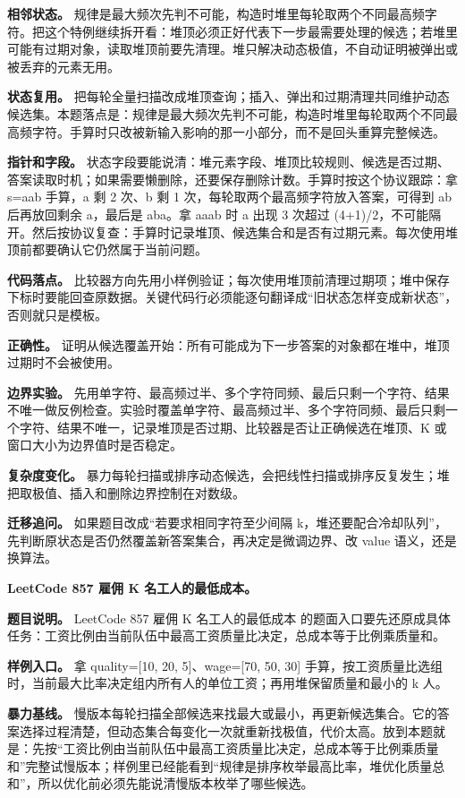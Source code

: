 \textbf{相邻状态。} 规律是最大频次先判不可能，构造时堆里每轮取两个不同最高频字符。把这个特例继续拆开看：堆顶必须正好代表下一步最需要处理的候选；若堆里可能有过期对象，读取堆顶前要先清理。堆只解决动态极值，不自动证明被弹出或被丢弃的元素无用。

\textbf{状态复用。} 把每轮全量扫描改成堆顶查询；插入、弹出和过期清理共同维护动态候选集。本题落点是：规律是最大频次先判不可能，构造时堆里每轮取两个不同最高频字符。手算时只改被新输入影响的那一小部分，而不是回头重算完整候选。

\textbf{指针和字段。} 状态字段要能说清：堆元素字段、堆顶比较规则、候选是否过期、答案读取时机；如果需要懒删除，还要保存删除计数。手算时按这个协议跟踪：拿 s=aab 手算，a 剩 2 次、b 剩 1 次，每轮取两个最高频字符放入答案，可得到 ab 后再放回剩余 a，最后是 aba。拿 aaab 时 a 出现 3 次超过 (4+1)/2，不可能隔开。然后按协议复查：手算时记录堆顶、候选集合和是否有过期元素。每次使用堆顶前都要确认它仍然属于当前问题。

\textbf{代码落点。} 比较器方向先用小样例验证；每次使用堆顶前清理过期项；堆中保存下标时要能回查原数据。关键代码行必须能逐句翻译成“旧状态怎样变成新状态”，否则就只是模板。

\textbf{正确性。} 证明从候选覆盖开始：所有可能成为下一步答案的对象都在堆中，堆顶过期时不会被使用。

\textbf{边界实验。} 先用单字符、最高频过半、多个字符同频、最后只剩一个字符、结果不唯一做反例检查。实验时覆盖单字符、最高频过半、多个字符同频、最后只剩一个字符、结果不唯一，记录堆顶是否过期、比较器是否让正确候选在堆顶、K 或窗口大小为边界值时是否稳定。

\textbf{复杂度变化。} 暴力每轮扫描或排序动态候选，会把线性扫描或排序反复发生；堆把取极值、插入和删除边界控制在对数级。

\textbf{迁移追问。} 如果题目改成“若要求相同字符至少间隔 k，堆还要配合冷却队列”，先判断原状态是否仍然覆盖新答案集合，再决定是微调边界、改 value 语义，还是换算法。

\noindent\textbf{LeetCode 857 雇佣 K 名工人的最低成本。}

\textbf{题目说明。} LeetCode 857 雇佣 K 名工人的最低成本 的题面入口要先还原成具体任务：工资比例由当前队伍中最高工资质量比决定，总成本等于比例乘质量和。

\textbf{样例入口。} 拿 quality=[10, 20, 5]、wage=[70, 50, 30] 手算，按工资质量比选组时，当前最大比率决定组内所有人的单位工资；再用堆保留质量和最小的 k 人。

\textbf{暴力基线。} 慢版本每轮扫描全部候选来找最大或最小，再更新候选集合。它的答案选择过程清楚，但动态集合每变化一次就重新找极值，代价太高。放到本题就是：先按“工资比例由当前队伍中最高工资质量比决定，总成本等于比例乘质量和”完整试慢版本；样例里已经能看到“规律是排序枚举最高比率，堆优化质量总和”，所以优化前必须先能说清慢版本枚举了哪些候选。

